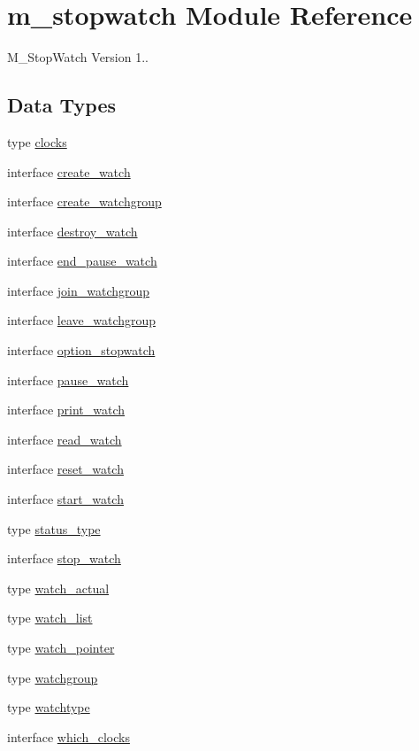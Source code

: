 \hypertarget{namespacem__stopwatch}{}\section{m\+\_\+stopwatch Module Reference}
\label{namespacem__stopwatch}


M\+\_\+\+Stop\+Watch Version 1..  


\subsection*{Data Types}
\begin{DoxyCompactItemize}
\item 
type \hyperlink{structm__stopwatch_1_1clocks}{clocks}
\item 
interface \hyperlink{interfacem__stopwatch_1_1create__watch}{create\+\_\+watch}
\item 
interface \hyperlink{interfacem__stopwatch_1_1create__watchgroup}{create\+\_\+watchgroup}
\item 
interface \hyperlink{interfacem__stopwatch_1_1destroy__watch}{destroy\+\_\+watch}
\item 
interface \hyperlink{interfacem__stopwatch_1_1end__pause__watch}{end\+\_\+pause\+\_\+watch}
\item 
interface \hyperlink{interfacem__stopwatch_1_1join__watchgroup}{join\+\_\+watchgroup}
\item 
interface \hyperlink{interfacem__stopwatch_1_1leave__watchgroup}{leave\+\_\+watchgroup}
\item 
interface \hyperlink{interfacem__stopwatch_1_1option__stopwatch}{option\+\_\+stopwatch}
\item 
interface \hyperlink{interfacem__stopwatch_1_1pause__watch}{pause\+\_\+watch}
\item 
interface \hyperlink{interfacem__stopwatch_1_1print__watch}{print\+\_\+watch}
\item 
interface \hyperlink{interfacem__stopwatch_1_1read__watch}{read\+\_\+watch}
\item 
interface \hyperlink{interfacem__stopwatch_1_1reset__watch}{reset\+\_\+watch}
\item 
interface \hyperlink{interfacem__stopwatch_1_1start__watch}{start\+\_\+watch}
\item 
type \hyperlink{structm__stopwatch_1_1status__type}{status\+\_\+type}
\item 
interface \hyperlink{interfacem__stopwatch_1_1stop__watch}{stop\+\_\+watch}
\item 
type \hyperlink{structm__stopwatch_1_1watch__actual}{watch\+\_\+actual}
\item 
type \hyperlink{structm__stopwatch_1_1watch__list}{watch\+\_\+list}
\item 
type \hyperlink{structm__stopwatch_1_1watch__pointer}{watch\+\_\+pointer}
\item 
type \hyperlink{structm__stopwatch_1_1watchgroup}{watchgroup}
\item 
type \hyperlink{structm__stopwatch_1_1watchtype}{watchtype}
\item 
interface \hyperlink{interfacem__stopwatch_1_1which__clocks}{which\+\_\+clocks}
\end{DoxyCompactItemize}
